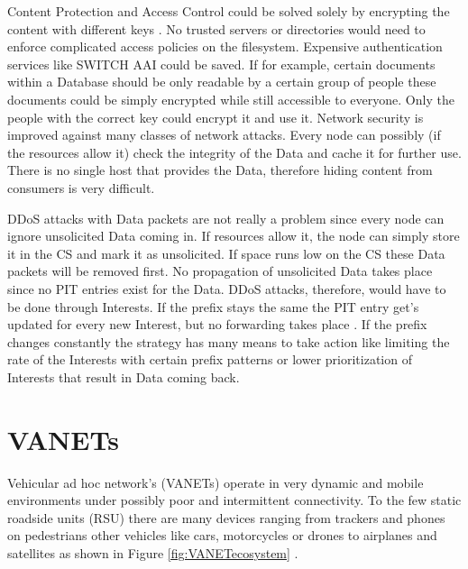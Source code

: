 \vspace{5mm} %

Content Protection and Access Control could be solved solely by encrypting the content with different keys \cite{jacobson09}. No trusted servers or directories would need to enforce complicated access policies on the filesystem. Expensive authentication services like SWITCH AAI could be saved. If for example, certain documents within a Database should be only readable by a certain group of people these documents could be simply encrypted while still accessible to everyone. Only the people with the correct key could encrypt it and use it.
Network security is improved against many classes of network attacks. Every node can possibly (if the resources allow it) check the integrity of the Data and cache it for further use. There is no single host that provides the Data, therefore hiding content from consumers is very difficult.

\vspace{5mm} %

DDoS attacks with Data packets are not really a problem since every node can ignore unsolicited Data coming in. If resources allow it, the node can simply store it in the CS and mark it as unsolicited. If space runs low on the CS these Data packets will be removed first. No propagation of unsolicited Data takes place since no PIT entries exist for the Data. DDoS attacks, therefore, would have to be done through Interests. If the prefix stays the same the PIT entry get's updated for every new Interest, but no forwarding takes place \cite{jacobson09}. If the prefix changes constantly the strategy has many means to take action like limiting the rate of the Interests with certain prefix patterns or lower prioritization of Interests that result in Data coming back. 

\newpage
\section{VANETs}

Vehicular ad hoc network's (VANETs) operate in very dynamic and mobile environments under possibly poor and intermittent connectivity. To the few static roadside units (RSU) there are many devices ranging from trackers and phones on pedestrians other vehicles like cars, motorcycles or drones to airplanes and satellites as shown in Figure \ref{fig:VANETecosystem} \cite{wu11}.

\vspace{5mm} %

